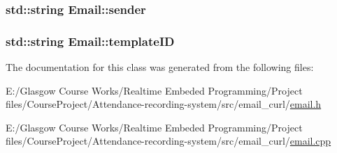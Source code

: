 \subsubsection[{sender}]{\setlength{\rightskip}{0pt plus 5cm}std\+::string Email\+::sender\hspace{0.3cm}{\ttfamily [private]}}\label{class_email_a95234a482f358f57b7c7bd32111e622c}
\hypertarget{class_email_af7f2e392dcec52a6ce310ff0fa4d37a7}{}
\subsubsection[{template\+I\+D}]{\setlength{\rightskip}{0pt plus 5cm}std\+::string Email\+::template\+I\+D\hspace{0.3cm}{\ttfamily [private]}}\label{class_email_af7f2e392dcec52a6ce310ff0fa4d37a7}


The documentation for this class was generated from the following files\+:\begin{DoxyCompactItemize}
\item 
E\+:/\+Glasgow Course Works/\+Realtime Embeded Programming/\+Project files/\+Course\+Project/\+Attendance-\/recording-\/system/src/email\+\_\+curl/\hyperlink{email_8h}{email.\+h}\item 
E\+:/\+Glasgow Course Works/\+Realtime Embeded Programming/\+Project files/\+Course\+Project/\+Attendance-\/recording-\/system/src/email\+\_\+curl/\hyperlink{email_8cpp}{email.\+cpp}\end{DoxyCompactItemize}
